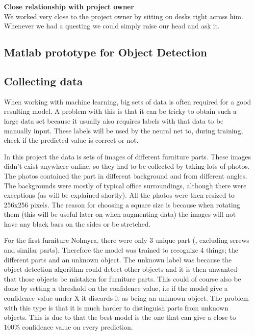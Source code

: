 \textbf{Close relationship with project owner} \\
We worked very close to the project owner by sitting on desks right across him. Whenever we had a questing we could simply raise our head and ask it.

\subsection{Matlab prototype for Object Detection}

\subsection{Collecting data}
When working with machine learning, big sets of data is often required for a good resulting model.
A problem with this is that it can be tricky to obtain such a large data set because it usually also requires
labels with that data to be manually input. These labels will be used by the neural net to, during training, check if
the predicted value is correct or not.

In this project the data is sets of images of different furniture parts. These images didn't exist anywhere online, so they had to be collected by taking lots of photos. The photos contained the part in different background and from different angles. The backgrounds were mostly of typical office surroundings, although there were exceptions (as will be explained shortly). All the photos were then resized to 256x256 pixels. The reason for choosing a square size is because when rotating them (this will be useful later on when augmenting data) the images will not have any black bars on the sides or be stretched.

For the first furniture Nolmyra, there were only 3 unique part (, excluding screws and similar parts). Therefore the model was trained to recognize 4 things; the different parts and an unknown object. The unknown label was because the object detection algorithm could detect other objects and it is then unwanted that those objects be mistaken for furniture parts. This could of course also be done by setting a threshold on the confidence value, i.e if the model give a confidence value under X it discards it as being an unknown object. The problem with this type is that it is much harder to distinguish parts from unknown objects. This is due to that the best model is the one that can give a close to 100\% confidence value on every prediction.

